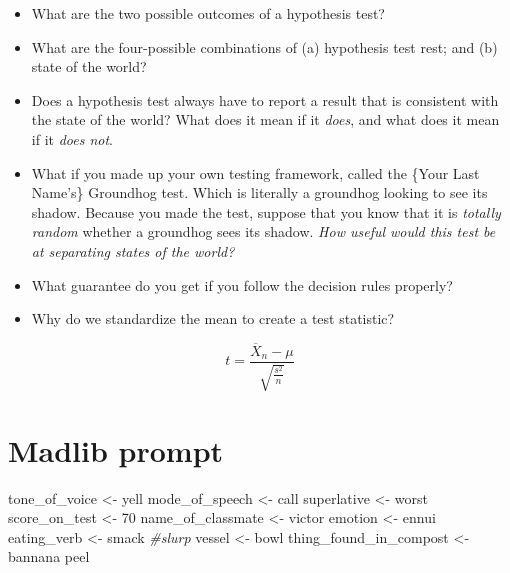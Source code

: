 \documentclass[
]{book}
\newenvironment{Shaded}{\begin{snugshade}}{\end{snugshade}}
\newcommand{\CommentTok}[1]{\textcolor[rgb]{0.56,0.35,0.01}{\textit{#1}}}
\newcommand{\NormalTok}[1]{#1}
\newcommand{\OtherTok}[1]{\textcolor[rgb]{0.56,0.35,0.01}{#1}}
\newcommand{\StringTok}[1]{\textcolor[rgb]{0.31,0.60,0.02}{#1}}
\providecommand{\tightlist}{%
  \setlength{\itemsep}{0pt}\setlength{\parskip}{0pt}}
\theoremstyle{definition}
\theoremstyle{definition}
\theoremstyle{definition}
\theoremstyle{definition}
\theoremstyle{remark}
\begin{document}
\begin{itemize}
\tightlist
\item
  What are the two possible outcomes of a hypothesis test?
\item
  What are the four-possible combinations of (a) hypothesis test rest; and (b) state of the world?
\item
  Does a hypothesis test always have to report a result that is consistent with the state of the world? What does it mean if it \emph{does}, and what does it mean if it \emph{does not}.
\item
  What if you made up your own testing framework, called the \{Your Last Name's\} Groundhog test. Which is literally a groundhog looking to see its shadow. Because you made the test, suppose that you know that it is \emph{totally random} whether a groundhog sees its shadow. \emph{How useful would this test be at separating states of the world?}\\
\item
  What guarantee do you get if you follow the decision rules properly?
\item
  Why do we standardize the mean to create a test statistic?
\end{itemize}

\[ 
  t = \frac{ \overline{X}_n - \mu}{\sqrt{\frac{s^2}{n}}}
\]

\hypertarget{madlib-prompt}{%
\section{Madlib prompt}\label{madlib-prompt}}

\begin{Shaded}
\begin{Highlighting}[]
\NormalTok{tone\_of\_voice     }\OtherTok{\textless{}{-}} \StringTok{\textquotesingle{}yell\textquotesingle{}}
\NormalTok{mode\_of\_speech    }\OtherTok{\textless{}{-}} \StringTok{\textquotesingle{}call\textquotesingle{}}
\NormalTok{superlative       }\OtherTok{\textless{}{-}} \StringTok{\textquotesingle{}worst\textquotesingle{}}
\NormalTok{score\_on\_test     }\OtherTok{\textless{}{-}} \StringTok{\textquotesingle{}70\textquotesingle{}}
\NormalTok{name\_of\_classmate }\OtherTok{\textless{}{-}} \StringTok{\textquotesingle{}victor\textquotesingle{}}
\NormalTok{emotion           }\OtherTok{\textless{}{-}} \StringTok{\textquotesingle{}ennui\textquotesingle{}}
\NormalTok{eating\_verb       }\OtherTok{\textless{}{-}} \StringTok{\textquotesingle{}smack\textquotesingle{}} \CommentTok{\#slurp}
\NormalTok{vessel            }\OtherTok{\textless{}{-}} \StringTok{\textquotesingle{}bowl\textquotesingle{}}
\NormalTok{thing\_found\_in\_compost }\OtherTok{\textless{}{-}} \StringTok{\textquotesingle{}bannana peel\textquotesingle{}}
\end{Highlighting}
\end{Shaded}
\end{document}
